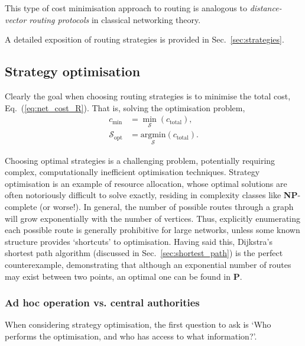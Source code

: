 \documentclass[aps, rmp, twocolumn, amsmath, amssymb, nofootinbib, superscriptaddress, longbibliography, floatfix, table-of-contents, eqsecnum]{revtex4-1}
\begin{document}
This type of cost minimisation approach to routing is analogous to \textit{distance-vector routing protocols} in classical networking theory.

A detailed exposition of routing strategies is provided in Sec.~\ref{sec:strategies}.

%
%

\subsection{Strategy optimisation} \label{sec:strat_opt}  

Clearly the goal when choosing routing strategies is to minimise the total cost, Eq.~(\ref{eq:net_cost_R}). That is, solving the optimisation problem,
\begin{align}
c_\text{min} &= \min_\mathcal{S} (c_\text{total}), \nonumber \\
\mathcal{S}_\text{opt} &= \underset{\mathcal{S}}{\text{argmin}} (c_\text{total}).
\end{align}

Choosing optimal strategies is a challenging problem, potentially requiring complex, computationally inefficient optimisation techniques. Strategy optimisation is an example of resource allocation, whose optimal solutions are often notoriously difficult to solve exactly, residing in complexity classes like \textbf{NP}-complete (or worse!). In general, the number of possible routes through a graph will grow exponentially with the number of vertices. Thus, explicitly enumerating each possible route is generally prohibitive for large networks, unless some known structure provides `shortcuts' to optimisation. Having said this, Dijkstra's shortest path algorithm (discussed in Sec.~\ref{sec:shortest_path}) is the perfect counterexample, demonstrating that although an exponential number of routes may exist between two points, an optimal one can be found in \textbf{P}.

%
%

\subsubsection{Ad hoc operation vs. central authorities}  

When considering strategy optimisation, the first question to ask is `Who performs the optimisation, and who has access to what information?'.
\end{document}
